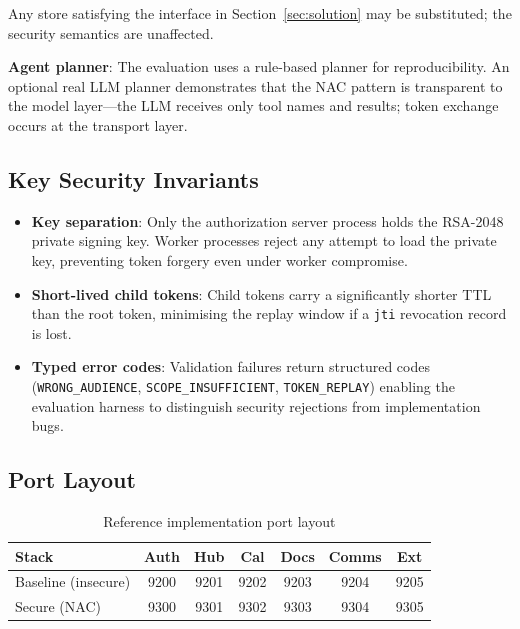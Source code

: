 \documentclass[journal]{IEEEtran}
\begin{document}
Any store satisfying the interface in Section~\ref{sec:solution} may be
substituted; the security semantics are unaffected.

\textbf{Agent planner}: The evaluation uses a rule-based planner for
reproducibility. An optional real LLM planner demonstrates that the NAC pattern
is transparent to the model layer---the LLM receives only tool names and results;
token exchange occurs at the transport layer.

\subsection{Key Security Invariants}

\begin{itemize}
  \item \textbf{Key separation}: Only the authorization server process holds the
        RSA-2048 private signing key. Worker processes reject any attempt to load
        the private key, preventing token forgery even under worker compromise.
  \item \textbf{Short-lived child tokens}: Child tokens carry a significantly
        shorter TTL than the root token, minimising the replay window if a
        \texttt{jti} revocation record is lost.
  \item \textbf{Typed error codes}: Validation failures return structured codes
        (\texttt{WRONG\_AUDIENCE}, \texttt{SCOPE\_INSUFFICIENT},
        \texttt{TOKEN\_REPLAY}) enabling the evaluation harness to distinguish
        security rejections from implementation bugs.
\end{itemize}

\subsection{Port Layout}

\begin{table}[h]
\caption{Reference implementation port layout}
\label{tab:ports}
\centering
\footnotesize
\begin{tabular}{lcccccc}
\toprule
\textbf{Stack} & \textbf{Auth} & \textbf{Hub} & \textbf{Cal}
               & \textbf{Docs} & \textbf{Comms} & \textbf{Ext} \\
\midrule
Baseline (insecure) & 9200 & 9201 & 9202 & 9203 & 9204 & 9205 \\
Secure (NAC)        & 9300 & 9301 & 9302 & 9303 & 9304 & 9305 \\
\bottomrule
\end{tabular}
\end{table}
\end{document}
